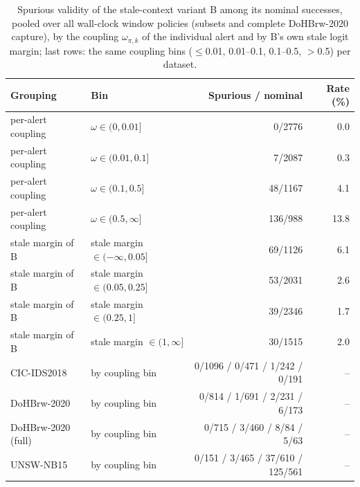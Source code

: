 \begin{table}[t]
\centering\footnotesize
\caption{Spurious validity of the stale-context variant B among its nominal successes, pooled over all wall-clock window policies (subsets and complete DoHBrw-2020 capture), by the coupling $\omega_{\pi,k}$ of the individual alert and by B's own stale logit margin; last rows: the same coupling bins ($\le$0.01, 0.01--0.1, 0.1--0.5, $>$0.5) per dataset.}
\label{tab:a-coupling}
\begin{tabular}{@{}llrr@{}}
\toprule
Grouping & Bin & Spurious / nominal & Rate (\%) \\
\midrule
per-alert coupling & $\omega\in(0,0.01]$ & 0/2776 & 0.0 \\
per-alert coupling & $\omega\in(0.01,0.1]$ & 7/2087 & 0.3 \\
per-alert coupling & $\omega\in(0.1,0.5]$ & 48/1167 & 4.1 \\
per-alert coupling & $\omega\in(0.5,\infty]$ & 136/988 & 13.8 \\
stale margin of B & stale margin $\in(-\infty,0.05]$ & 69/1126 & 6.1 \\
stale margin of B & stale margin $\in(0.05,0.25]$ & 53/2031 & 2.6 \\
stale margin of B & stale margin $\in(0.25,1]$ & 39/2346 & 1.7 \\
stale margin of B & stale margin $\in(1,\infty]$ & 30/1515 & 2.0 \\
CIC-IDS2018 & by coupling bin & 0/1096 / 0/471 / 1/242 / 0/191 & -- \\
DoHBrw-2020 & by coupling bin & 0/814 / 1/691 / 2/231 / 6/173 & -- \\
DoHBrw-2020 (full) & by coupling bin & 0/715 / 3/460 / 8/84 / 5/63 & -- \\
UNSW-NB15 & by coupling bin & 0/151 / 3/465 / 37/610 / 125/561 & -- \\
\bottomrule
\end{tabular}
\end{table}
